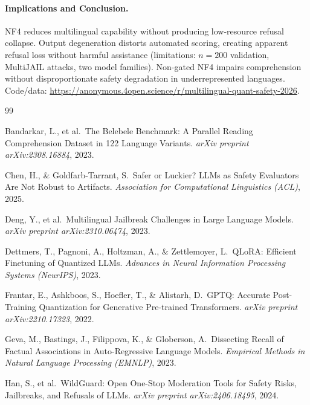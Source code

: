 \documentclass{article}
\begin{document}
\paragraph{Implications and Conclusion.}
NF4 reduces multilingual capability without producing low-resource refusal collapse. Output degeneration distorts automated scoring, creating apparent refusal loss without harmful assistance (limitations: $n{=}200$ validation, MultiJAIL attacks, two model families). Non-gated NF4 impairs comprehension without disproportionate safety degradation in underrepresented languages. Code/data: \url{https://anonymous.4open.science/r/multilingual-quant-safety-2026}.

\clearpage

\begin{thebibliography}{99}

Bandarkar, L., et al.\ The Belebele Benchmark: A Parallel Reading Comprehension Dataset in 122 Language Variants.
\emph{arXiv preprint arXiv:2308.16884}, 2023.

Chen, H., \& Goldfarb-Tarrant, S.\ Safer or Luckier? LLMs as Safety Evaluators Are Not Robust to Artifacts.
\emph{Association for Computational Linguistics (ACL)}, 2025.

Deng, Y., et al.\ Multilingual Jailbreak Challenges in Large Language Models.
\emph{arXiv preprint arXiv:2310.06474}, 2023.

Dettmers, T., Pagnoni, A., Holtzman, A., \& Zettlemoyer, L.\ QLoRA: Efficient Finetuning of Quantized LLMs.
\emph{Advances in Neural Information Processing Systems (NeurIPS)}, 2023.

Frantar, E., Ashkboos, S., Hoefler, T., \& Alistarh, D.\ GPTQ: Accurate Post-Training Quantization for Generative Pre-trained Transformers.
\emph{arXiv preprint arXiv:2210.17323}, 2022.

Geva, M., Bastings, J., Filippova, K., \& Globerson, A.\ Dissecting Recall of Factual Associations in Auto-Regressive Language Models.
\emph{Empirical Methods in Natural Language Processing (EMNLP)}, 2023.

Han, S., et al.\ WildGuard: Open One-Stop Moderation Tools for Safety Risks, Jailbreaks, and Refusals of LLMs.
\emph{arXiv preprint arXiv:2406.18495}, 2024.


\end{thebibliography}
\end{document}
